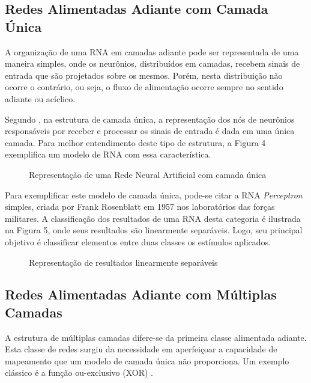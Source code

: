 \subsection{Redes Alimentadas Adiante com Camada Única}
A organização de uma RNA em camadas adiante pode ser representada de uma maneira simples, onde os neurônios, distribuídos em camadas, recebem sinais de entrada que são projetados sobre os mesmos. Porém, nesta distribuição não ocorre o contrário, ou seja, o fluxo de alimentação ocorre sempre no sentido adiante ou acíclico.
 
Segundo , na estrutura de camada única, a representação dos nós de neurônios responsáveis por receber e processar os sinais de entrada é dada em uma única camada. Para melhor entendimento deste tipo de estrutura, a Figura 4 exemplifica um modelo de RNA com essa característica.

\begin{figure}[h]
	\centering
	\caption{Representação de uma Rede Neural Artificial com camada única}
	\label{exec-rna-camada-unica}
\end{figure}

Para exemplificar este modelo de camada única, pode-se citar a RNA \textit{Perceptron} simples, criada por Frank Rosenblatt em 1957 nos laboratórios das forças militares. A classificação dos resultados de uma RNA desta categoria é ilustrada na Figura 5, onde seus resultados são linearmente separáveis. Logo, seu principal objetivo é classificar elementos entre duas classes os estímulos aplicados.

\begin{figure}[h]
	\centering
	\caption{Representação de resultados linearmente separáveis}
	\label{exec-linearmente-separavel}
\end{figure}

\subsection{Redes Alimentadas Adiante com Múltiplas Camadas}
A estrutura de múltiplas camadas difere-se da primeira classe alimentada adiante. Esta classe de redes surgiu da necessidade em aperfeiçoar a capacidade de mapeamento que um modelo de camada única não proporciona. Um exemplo clássico é a função ou-exclusivo (XOR) \cite{haykin2009}.

